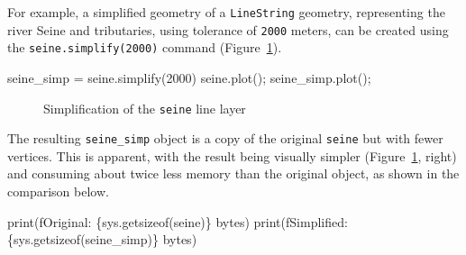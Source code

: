 \documentclass[
  letterpaper,
]{krantz}
\newenvironment{Shaded}{\begin{snugshade}}{\end{snugshade}}
\newcommand{\BuiltInTok}[1]{\textcolor[rgb]{0.00,0.23,0.31}{#1}}
\newcommand{\DecValTok}[1]{\textcolor[rgb]{0.68,0.00,0.00}{#1}}
\newcommand{\NormalTok}[1]{\textcolor[rgb]{0.00,0.23,0.31}{#1}}
\newcommand{\OperatorTok}[1]{\textcolor[rgb]{0.37,0.37,0.37}{#1}}
\newcommand{\SpecialCharTok}[1]{\textcolor[rgb]{0.37,0.37,0.37}{#1}}
\newcommand{\SpecialStringTok}[1]{\textcolor[rgb]{0.13,0.47,0.30}{#1}}
\begin{document}
For example, a simplified geometry of a
\texttt{\textquotesingle{}LineString\textquotesingle{}} geometry,
representing the river Seine and tributaries, using tolerance of
\texttt{2000} meters, can be created using the
\texttt{seine.simplify(2000)} command (Figure~\ref{fig-simplify-lines}).

\begin{Shaded}
\begin{Highlighting}[]
\NormalTok{seine\_simp }\OperatorTok{=}\NormalTok{ seine.simplify(}\DecValTok{2000}\NormalTok{)}
\NormalTok{seine.plot()}\OperatorTok{;}
\NormalTok{seine\_simp.plot()}\OperatorTok{;}
\end{Highlighting}
\end{Shaded}

\begin{figure}

\begin{minipage}{0.50\linewidth}



\end{minipage}%
%
\begin{minipage}{0.50\linewidth}



\end{minipage}%

\caption{\label{fig-simplify-lines}Simplification of the \texttt{seine}
line layer}

\end{figure}%

The resulting \texttt{seine\_simp} object is a copy of the original
\texttt{seine} but with fewer vertices. This is apparent, with the
result being visually simpler (Figure~\ref{fig-simplify-lines}, right)
and consuming about twice less memory than the original object, as shown
in the comparison below.

\begin{Shaded}
\begin{Highlighting}[]
\BuiltInTok{print}\NormalTok{(}\SpecialStringTok{f\textquotesingle{}Original: }\SpecialCharTok{\{}\NormalTok{sys}\SpecialCharTok{.}\NormalTok{getsizeof(seine)}\SpecialCharTok{\}}\SpecialStringTok{ bytes\textquotesingle{}}\NormalTok{)}
\BuiltInTok{print}\NormalTok{(}\SpecialStringTok{f\textquotesingle{}Simplified: }\SpecialCharTok{\{}\NormalTok{sys}\SpecialCharTok{.}\NormalTok{getsizeof(seine\_simp)}\SpecialCharTok{\}}\SpecialStringTok{ bytes\textquotesingle{}}\NormalTok{)}
\end{Highlighting}
\end{Shaded}
\end{document}
